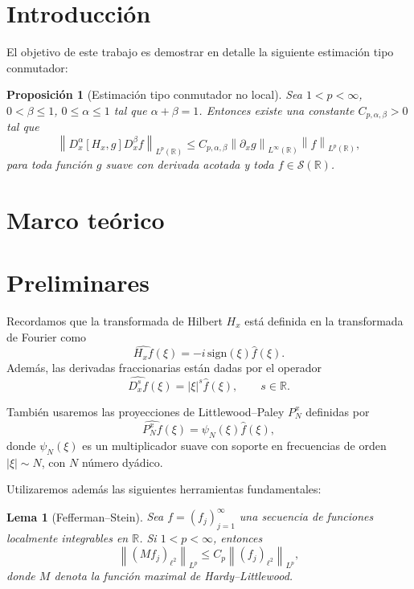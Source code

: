 \documentclass{aleph-revista}
\newtheorem{proposition}{Proposición}
\newtheorem{lemma}{Lema}
\begin{document}
\membrete
\section{Introducción}
El objetivo de este trabajo es demostrar en detalle la siguiente estimación tipo conmutador:
\begin{proposition}[Estimación tipo conmutador no local]
Sea $1 < p < \infty$, $0 < \beta \leq 1$, $0 \leq \alpha \leq 1$ tal que $\alpha + \beta = 1$. Entonces existe una constante $C_{p,\alpha,\beta} > 0$ tal que
\[
\left\| D_x^{\alpha} [H_x, g] D_x^{\beta} f \right\|_{L^p(\mathbb{R})} \leq C_{p,\alpha,\beta} \left\| \partial_x g \right\|_{L^\infty(\mathbb{R})} \left\| f \right\|_{L^p(\mathbb{R})},
\]
para toda función $g$ suave con derivada acotada y toda $f \in \mathcal{S}(\mathbb{R})$.
\end{proposition}
\section{Marco teórico}
\section{Preliminares}

Recordamos que la transformada de Hilbert $H_x$ está definida en la transformada de Fourier como
\[
\widehat{H_x f}(\xi) = -i\,\mathrm{sign}(\xi) \hat{f}(\xi).
\]
Además, las derivadas fraccionarias están dadas por el operador
\[
\widehat{D_x^s f}(\xi) = |\xi|^s \hat{f}(\xi), \qquad s \in \mathbb{R}.
\]

También usaremos las proyecciones de Littlewood–Paley $P^x_N$ definidas por
\[
\widehat{P^x_N f}(\xi) = \psi_N(\xi) \hat{f}(\xi),
\]
donde $\psi_N(\xi)$ es un multiplicador suave con soporte en frecuencias de orden $|\xi| \sim N$, con $N$ número dyádico.

Utilizaremos además las siguientes herramientas fundamentales:

\begin{lemma}[Fefferman–Stein]
Sea $f = (f_j)_{j=1}^{\infty}$ una secuencia de funciones localmente integrables en $\mathbb{R}$. Si $1 < p < \infty$, entonces
\[
\left\| (Mf_j)_{\ell^2} \right\|_{L^p} \leq C_p \left\| (f_j)_{\ell^2} \right\|_{L^p},
\]
donde $M$ denota la función maximal de Hardy–Littlewood.
\end{lemma}
\end{document}
